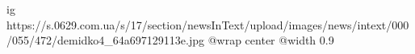  
 
 
 
 

\ifcmt
  ig https://s.0629.com.ua/s/17/section/newsInText/upload/images/news/intext/000/055/472/demidko4_64a697129113e.jpg
  @wrap center
  @width 0.9
\fi
